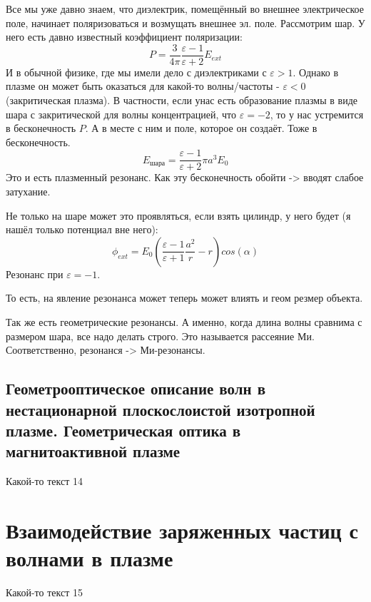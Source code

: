 \documentclass[10pt, a4paper]{article}
\let\stdsection\section
\renewcommand\section{\newpage\stdsection}
\begin{document}
Все мы уже давно знаем, что диэлектрик, помещённый во внешнее электрическое поле, начинает поляризоваться и возмущать внешнее эл. поле. Рассмотрим шар. У него есть давно известный коэффициент поляризации:
\begin{equation}
	P=\frac{3}{4\pi}\frac{\varepsilon - 1}{\varepsilon + 2} E_{ext}
\end{equation}
И в обычной физике, где мы имели дело с диэлектриками с $\varepsilon>1$. Однако в плазме он может быть оказаться для какой-то волны/частоты - $\varepsilon<0$ (закритическая плазма). В частности, если унас есть образование плазмы в виде шара с закритической для волны концентрацией, что $\varepsilon = -2$, то у нас устремится в бесконечность $P$. А в месте с ним и поле, которое он создаёт. Тоже в бесконечность.
\begin{equation}
	E_{\text{шара}}=\frac{\varepsilon - 1}{\varepsilon + 2} \pi a^3 E_0
\end{equation}
Это и есть плазменный резонанс. Как эту бесконечность обойти -> вводят слабое затухание.



Не только на шаре может это проявляться, если взять цилиндр, у него будет (я нашёл только потенциал вне него):
\begin{equation}
	\phi_{ext}=E_0(\frac{\varepsilon-1}{\varepsilon+1} \frac{a^2}{r} - r) cos(\alpha)
\end{equation}
Резонанс при $\varepsilon=-1$.

То есть, на явление резонанса может теперь может влиять и геом резмер объекта.

Так же есть геометрические резонансы. А именно, когда длина волны сравнима с размером шара, все надо делать строго. Это называется рассеяние Ми. Соответственно, резонанся -> Ми-резонансы.

\subsection{Геометрооптическое описание волн в нестационарной плоскослоистой изотропной плазме. Геометрическая оптика в магнитоактивной плазме}

Какой-то текст 14

\section{Взаимодействие заряженных частиц с волнами в плазме}

Какой-то текст 15
\end{document}
